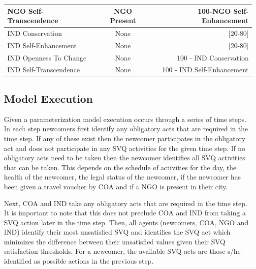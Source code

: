 \documentclass{scspaperproc}
\theoremstyle{scsthe}
\begin{document}
\begin{table}[ht]
\begin{center}
{\begin{tabular}{|lcr|}
\hline
NGO Self-Transcendence                                                                                      & NGO Present           &  100-NGO Self-Enhancement   \\
\hline
IND Conservation                                                                                            & None                  & {[}20-80{]}                \\
\hline
IND Self-Enhancement                                                                                        & None                  & {[}20-80{]}                \\
\hline
IND Openness To Change                                                                                      & None                  &  100 - IND Conservation     \\
\hline
IND Self-Transcendence                                                                                      & None                  &  100 - IND Self-Enhancement \\
\hline
\end{tabular}}
\end{center}
\end{table}

\subsection{Model Execution}
Given a parameterization model execution occurs through a series of time steps. In each step newcomers first identify any obligatory acts that are required in the time step. If any of these exist then the newcomer participates in the obligatory act and does not participate in any SVQ activities for the given time step. If no obligatory acts need to be taken then the newcomer identifies all SVQ activities that can be taken. This depends on the schedule of activities for the day, the health of the newcomer, the legal status of the newcomer, if the newcomer has been given a travel voucher by COA and if a NGO is present in their city. 

Next, COA and IND take any obligatory acts that are required in the time step. It is important to note that this does not preclude COA and IND from taking a SVQ action later in the time step. Then, all agents (newcomers, COA, NGO and IND) identify their most unsatisfied SVQ and identifies the SVQ act which minimizes the difference between their unsatisfied values given their SVQ satisfaction thresholds. For a newcomer, the available SVQ acts are those s/he identified as possible actions in the previous step.   
\end{document}
